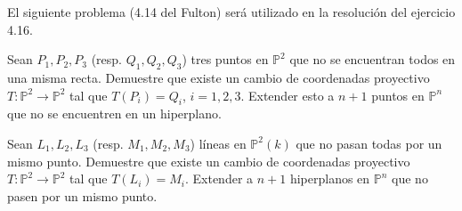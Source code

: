 \documentclass[12pt]{amsart}
\newenvironment{ejercicio}[1]{%
  \begin{trivlist}\item[\hskip\labelsep\textbf{Ejercicio #1.}]\itshape%
}{\end{trivlist}}
\begin{document}
\medskip
\noindent El siguiente problema (4.14 del Fulton) será utilizado en la resolución del ejercicio 4.16.

\medskip
\begin{ejercicio}{4.14}
Sean $P_1, P_2, P_3$ (resp. $Q_1, Q_2, Q_3$) tres puntos en $\mathbb{P}^2$ que no se encuentran todos en una misma recta. Demuestre que existe un cambio de coordenadas proyectivo $T: \mathbb{P}^2 \to \mathbb{P}^2$ tal que $T(P_i) = Q_i$, $i = 1, 2, 3$. Extender esto a $n+1$ puntos en $\mathbb{P}^n$ que no se encuentren en un hiperplano.
\end{ejercicio}

\medskip
\begin{ejercicio}{4.16}
Sean $L_1, L_2, L_3$ (resp. $M_1, M_2, M_3$) líneas en $\mathbb{P}^2(k)$ que no pasan todas por un mismo punto. Demuestre que existe un cambio de coordenadas proyectivo $T: \mathbb{P}^2 \to \mathbb{P}^2$ tal que $T(L_i) = M_i$. Extender a $n+1$ hiperplanos en $\mathbb{P}^n$ que no pasen por un mismo punto.
\end{ejercicio}
\end{document}
